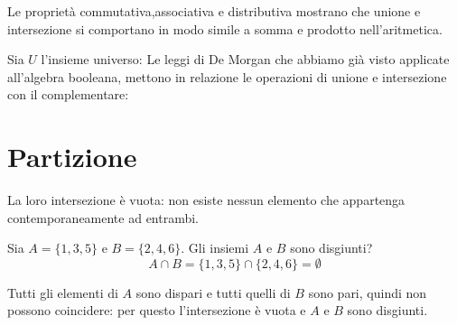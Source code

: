 


\begin{osservazione}
    Le proprietà commutativa,associativa e distributiva mostrano che unione e intersezione si comportano in modo simile a somma e prodotto nell'aritmetica.
\end{osservazione}
Sia $U$ l'insieme universo:
Le leggi di De Morgan che abbiamo già visto applicate all'algebra
booleana, mettono in relazione le operazioni di unione e
intersezione con il complementare:


\section{Partizione}


 La loro intersezione è vuota: non esiste nessun elemento che appartenga contemporaneamente ad entrambi.

\begin{esempio}
Sia $A = \{1, 3, 5\}$ e $B = \{2, 4, 6\}$. Gli insiemi $A$ e $B$ sono disgiunti?
\[
A \cap B = \{1, 3, 5\} \cap \{2, 4, 6\} = \emptyset
\]
\end{esempio} 
Tutti gli elementi di \(A\) sono dispari e tutti quelli di \(B\) sono pari, quindi non possono coincidere: per questo l'intersezione è vuota e \(A\) e \(B\) sono disgiunti.


